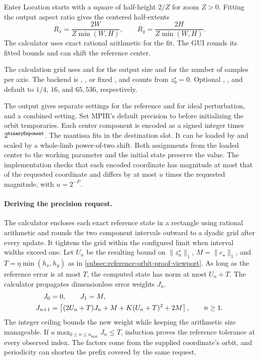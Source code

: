 Enter Location starts with a square of half-height \(2/Z\) for zoom
\(Z>0\). Fitting the output aspect ratio gives the centered half-extents
\begin{equation}
  R_x=\frac{2W}{Z\min(W,H)},\qquad R_y=\frac{2H}{Z\min(W,H)} .
\end{equation}
The calculator uses exact rational arithmetic for the fit. The GUI
rounds its fitted bounds and can shift the reference center.

The calculation grid uses  and  for the output
size and  for the number of samples per axis. The
backend is , , or fixed , and  counts from
\(z_0^\star=0\). Optional , ,
and  default to \(1/4\), \(16\), and \(65{,}536\),
respectively.

The output gives separate settings for the reference and for ideal
perturbation, and a combined setting. Set MPIR's default precision to
 before initializing the orbit temporaries. Each
center component is encoded as a signed integer  times
\(2^{\text{\texttt{binaryExponent}}}\). The mantissa fits in the destination
slot. It can be loaded by  and scaled by a
whole-limb power-of-two shift. Both assignments from the loaded center
to the working parameter and the initial state preserve the value.
The implementation checks that each encoded coordinate has magnitude
at most that of the requested coordinate and differs by at most
\(u\) times the requested magnitude, with \(u=2^{-P}\).

\paragraph{Deriving the precision request.}
The calculator encloses each exact reference state in a rectangle
using rational arithmetic and rounds the two component intervals
outward to a dyadic grid after every update. It tightens the grid
within the configured limit when interval widths exceed one.
Let \(U_n\) be the resulting bound on \(\lVert z_n^\star\rVert_1\),
\(M=\lVert c_\star\rVert_1\), and \(T=\eta\min(h_x,h_y)\) as in
\cref{subsec:reference-orbit-proof-viewport}. As long as the reference
error is at most \(T\), the computed state has norm at most \(U_n+T\).
The calculator propagates dimensionless error weights \(J_n\).
\begin{align}
  J_0 &= 0,\qquad J_1=M,\notag\\
  J_{n+1} &= \left\lceil (2U_n+T)J_n+
    M+K(U_n+T)^2+2M\right\rceil,\qquad n\ge1 .
  \label{eq:reference-orbit-precision-estimator}
\end{align}
The integer ceiling bounds the new weight while keeping the arithmetic
size manageable. If \(u\max_{0\le n\le n_{\max}}J_n\le T\), induction
proves the reference tolerance at every observed index. The factors
come from the supplied coordinate's orbit, and periodicity can shorten
the prefix covered by the same request.

